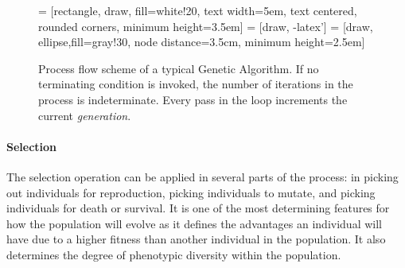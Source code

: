 \documentclass[a4paper,12pt]{article}
\theoremstyle{plain}
\theoremstyle{definition}
\begin{document}
         \begin{figure}[H]
            \centering
             = [rectangle, draw, fill=white!20, 
                text width=5em, text centered, rounded corners, minimum height=3.5em]
             = [draw, -latex'] 
             = [draw,
               ellipse,fill=gray!30, node distance=3.5cm,
            minimum height=2.5em]
                
            \caption{Process flow scheme of a typical Genetic Algorithm. If no
            terminating condition is invoked, the number of iterations in the
         process is indeterminate. Every pass in the loop increments the current \textit{generation}.}
            \label{fig:structure}
         \end{figure}
         
         \paragraph{Selection}
            The selection operation can be applied in several parts of the
            process: in picking out individuals for reproduction, picking
            individuals to mutate, and picking individuals for death or survival.        
            It is one of the most determining features for how the population will evolve 
            as it defines the advantages an individual will have due to a higher
            fitness than another individual in the population. It also determines 
            the degree of phenotypic diversity within the population.
\end{document}
